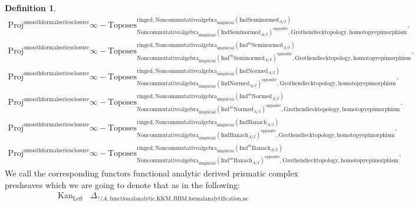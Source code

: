 \documentclass[11pt]{book}
\theoremstyle{definition}
\newtheorem{definition}[theorem]{Definition}
\numberwithin{equation}{section}
\begin{document}
\begin{definition}
\begin{align}
\mathrm{Proj}^\text{smoothformalseriesclosure}\infty-\mathrm{Toposes}^{\mathrm{ringed},\mathrm{Noncommutativealgebra}_{\mathrm{simplicial}}(\mathrm{Ind}\mathrm{Seminormed}_{A/I})}_{\mathrm{Noncommutativealgebra}_{\mathrm{simplicial}}(\mathrm{Ind}\mathrm{Seminormed}_{A/I})^\mathrm{opposite},\mathrm{Grothendiecktopology,homotopyepimorphism}}. \\
\mathrm{Proj}^\text{smoothformalseriesclosure}\infty-\mathrm{Toposes}^{\mathrm{ringed},\mathrm{Noncommutativealgebra}_{\mathrm{simplicial}}(\mathrm{Ind}^m\mathrm{Seminormed}_{A/I})}_{\mathrm{Noncommutativealgebra}_{\mathrm{simplicial}}(\mathrm{Ind}^m\mathrm{Seminormed}_{A/I})^\mathrm{opposite},\mathrm{Grothendiecktopology,homotopyepimorphism}}.\\
\mathrm{Proj}^\text{smoothformalseriesclosure}\infty-\mathrm{Toposes}^{\mathrm{ringed},\mathrm{Noncommutativealgebra}_{\mathrm{simplicial}}(\mathrm{Ind}\mathrm{Normed}_{A/I})}_{\mathrm{Noncommutativealgebra}_{\mathrm{simplicial}}(\mathrm{Ind}\mathrm{Normed}_{A/I})^\mathrm{opposite},\mathrm{Grothendiecktopology,homotopyepimorphism}}.\\
\mathrm{Proj}^\text{smoothformalseriesclosure}\infty-\mathrm{Toposes}^{\mathrm{ringed},\mathrm{Noncommutativealgebra}_{\mathrm{simplicial}}(\mathrm{Ind}^m\mathrm{Normed}_{A/I})}_{\mathrm{Noncommutativealgebra}_{\mathrm{simplicial}}(\mathrm{Ind}^m\mathrm{Normed}_{A/I})^\mathrm{opposite},\mathrm{Grothendiecktopology,homotopyepimorphism}}.\\
\mathrm{Proj}^\text{smoothformalseriesclosure}\infty-\mathrm{Toposes}^{\mathrm{ringed},\mathrm{Noncommutativealgebra}_{\mathrm{simplicial}}(\mathrm{Ind}\mathrm{Banach}_{A/I})}_{\mathrm{Noncommutativealgebra}_{\mathrm{simplicial}}(\mathrm{Ind}\mathrm{Banach}_{A/I})^\mathrm{opposite},\mathrm{Grothendiecktopology,homotopyepimorphism}}.\\
\mathrm{Proj}^\text{smoothformalseriesclosure}\infty-\mathrm{Toposes}^{\mathrm{ringed},\mathrm{Noncommutativealgebra}_{\mathrm{simplicial}}(\mathrm{Ind}^m\mathrm{Banach}_{A/I})}_{\mathrm{Noncommutativealgebra}_{\mathrm{simplicial}}(\mathrm{Ind}^m\mathrm{Banach}_{A/I})^\mathrm{opposite},\mathrm{Grothendiecktopology,homotopyepimorphism}}. 
\end{align}
We call the corresponding functors functional analytic derived prismatic complex presheaves which we are going to denote that as in the following:
\begin{align}
\mathrm{Kan}_{\mathrm{Left}}&\Delta_{?/A,\text{functionalanalytic,KKM},\text{BBM,formalanalytification,nc}}\\

\end{align}
\end{definition}
\end{document}

